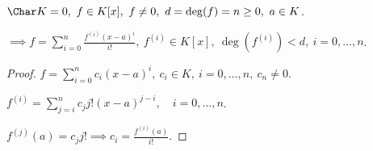 \begin{theorem-non}
    $\Char K = 0,~ f \in K[x],~ f \neq 0,~ d = \deg(f) = n \geq 0,~ a \in K$.

    $\implies f = \sum\limits_{i = 0}^n \frac{f^{(i)}(x - a)^i}{i!},~ f^{(i)} \in K[x],~ \deg(f^{(i)}) < d,~ i = 0, \dots, n$.
\end{theorem-non}

\begin{proof}
    $f = \sum\limits_{i = 0}^n c_i(x - a)^i,~ c_i \in K,~ i = 0, \ldots, n,~ c_n \neq 0$.

    $f^{(i)} = \sum\limits_{j = i}^{n} c_{j}j!(x - a)^{j - i},\quad i = 0, \ldots, n$.

    $f^{(j)}(a) = c_jj! \implies c_i = \frac{f^{(i)}(a)}{i!}$.
\end{proof}